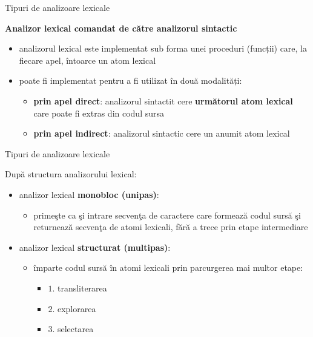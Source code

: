 \documentclass[pdf]{beamer}
\begin{document}
\begin{frame}{Tipuri de analizoare lexicale}

\textbf{Analizor lexical \textbf{comandat} de către analizorul sintactic}

\begin{itemize}
\item{analizorul lexical este implementat sub forma unei proceduri (funcții) care, la fiecare apel, întoarce un atom lexical}

\item{poate fi implementat pentru a fi utilizat în două modalități:}

\begin{itemize}
\item{\textbf{prin apel direct}: analizorul sintactit cere \textbf{următorul atom lexical} care poate fi extras din codul sursa}

\item{\textbf{prin apel indirect}: analizorul sintactic cere un anumit atom lexical}
\end{itemize}
\end{itemize}
\end{frame}



\begin{frame}{Tipuri de analizoare lexicale}

După structura analizorului lexical:

\begin{itemize}
\item 
analizor lexical \textbf{monobloc (unipas)}: 
\begin{itemize}
\item
primeşte ca şi intrare secvenţa de caractere care formează codul sursă şi returnează secvenţa de atomi lexicali, fără a trece prin etape intermediare
\end{itemize}

\item
analizor lexical \textbf{structurat (multipas)}: 
\begin{itemize}
\item
împarte codul sursă în atomi lexicali prin parcurgerea mai multor etape:
\begin{itemize}
\item
$1$. transliterarea
\item
$2$. explorarea
\item
$3$. selectarea
\end{itemize}
\end{itemize}
\end{itemize}
\end{frame}
\end{document}

